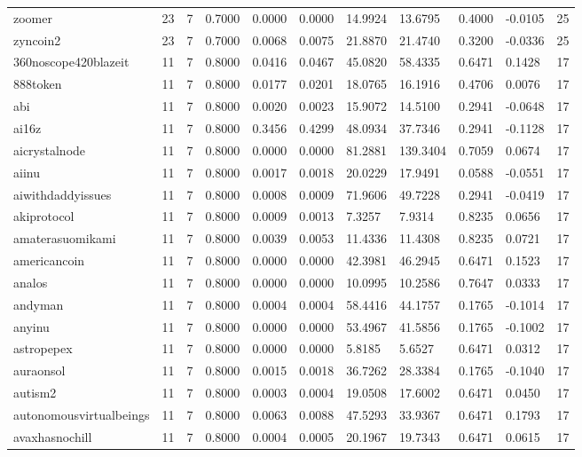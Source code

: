 \begin{table}[htbp]
\begin{tabular}{lllllllllll}
zoomer & 23 & 7 & 0.7000 & 0.0000 & 0.0000 & 14.9924 & 13.6795 & 0.4000 & -0.0105 & 25 \\
zyncoin2 & 23 & 7 & 0.7000 & 0.0068 & 0.0075 & 21.8870 & 21.4740 & 0.3200 & -0.0336 & 25 \\
360noscope420blazeit & 11 & 7 & 0.8000 & 0.0416 & 0.0467 & 45.0820 & 58.4335 & 0.6471 & 0.1428 & 17 \\
888token & 11 & 7 & 0.8000 & 0.0177 & 0.0201 & 18.0765 & 16.1916 & 0.4706 & 0.0076 & 17 \\
abi & 11 & 7 & 0.8000 & 0.0020 & 0.0023 & 15.9072 & 14.5100 & 0.2941 & -0.0648 & 17 \\
ai16z & 11 & 7 & 0.8000 & 0.3456 & 0.4299 & 48.0934 & 37.7346 & 0.2941 & -0.1128 & 17 \\
aicrystalnode & 11 & 7 & 0.8000 & 0.0000 & 0.0000 & 81.2881 & 139.3404 & 0.7059 & 0.0674 & 17 \\
aiinu & 11 & 7 & 0.8000 & 0.0017 & 0.0018 & 20.0229 & 17.9491 & 0.0588 & -0.0551 & 17 \\
aiwithdaddyissues & 11 & 7 & 0.8000 & 0.0008 & 0.0009 & 71.9606 & 49.7228 & 0.2941 & -0.0419 & 17 \\
akiprotocol & 11 & 7 & 0.8000 & 0.0009 & 0.0013 & 7.3257 & 7.9314 & 0.8235 & 0.0656 & 17 \\
amaterasuomikami & 11 & 7 & 0.8000 & 0.0039 & 0.0053 & 11.4336 & 11.4308 & 0.8235 & 0.0721 & 17 \\
americancoin & 11 & 7 & 0.8000 & 0.0000 & 0.0000 & 42.3981 & 46.2945 & 0.6471 & 0.1523 & 17 \\
analos & 11 & 7 & 0.8000 & 0.0000 & 0.0000 & 10.0995 & 10.2586 & 0.7647 & 0.0333 & 17 \\
andyman & 11 & 7 & 0.8000 & 0.0004 & 0.0004 & 58.4416 & 44.1757 & 0.1765 & -0.1014 & 17 \\
anyinu & 11 & 7 & 0.8000 & 0.0000 & 0.0000 & 53.4967 & 41.5856 & 0.1765 & -0.1002 & 17 \\
astropepex & 11 & 7 & 0.8000 & 0.0000 & 0.0000 & 5.8185 & 5.6527 & 0.6471 & 0.0312 & 17 \\
auraonsol & 11 & 7 & 0.8000 & 0.0015 & 0.0018 & 36.7262 & 28.3384 & 0.1765 & -0.1040 & 17 \\
autism2 & 11 & 7 & 0.8000 & 0.0003 & 0.0004 & 19.0508 & 17.6002 & 0.6471 & 0.0450 & 17 \\
autonomousvirtualbeings & 11 & 7 & 0.8000 & 0.0063 & 0.0088 & 47.5293 & 33.9367 & 0.6471 & 0.1793 & 17 \\
avaxhasnochill & 11 & 7 & 0.8000 & 0.0004 & 0.0005 & 20.1967 & 19.7343 & 0.6471 & 0.0615 & 17 \\

\end{tabular}
\end{table}

